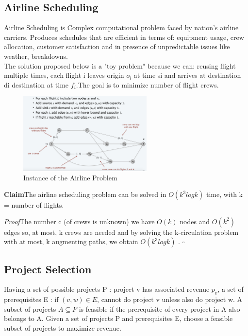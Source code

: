 \documentclass[11pt]{article}
\newenvironment{claim}[1]{\par\textbf{Claim}\space#1}{}
\newenvironment{proof}[1]{\par\textit{Proof}\space#1}{\hfill\ensuremath{\square}}
\begin{document}
\subsection{Airline Scheduling}

Airline Scheduling is Complex computational problem faced by nation's airline carriers. Produces schedules that are efficient in terms of: equipment usage, crew allocation, customer satisfaction
and in presence of unpredictable issues like weather, breakdowns.\\
The solution proposed below is a "toy problem" because we can: reusing flight multiple times, each
flight i leaves origin $o_{i}$ at time si and arrives at destination di destination at time $f_{i}$.The goal is to minimize number of flight crews.

\begin{figure}[H]
		\centering
		\includegraphics[width=0.6\textwidth ]{airline}
		\caption{Instance of the Airline Problem}
\end{figure}

\begin{claim}
The airline scheduling problem can be solved in $O(k^{3} log k)$ time, with k = number of flights.
\end{claim}

\begin{proof}
The number c (of crews is unknown) we have $O(k)$ nodes and $O(k^{2})$ edges so, at most, k crews are needed and by solving the k-circulation problem with at most, k augmenting paths, we obtain $O(k^{3} log k)$ .
\end{proof}

\subsection{Project Selection}
Having a set of possible projects P : project v has associated revenue $p_{v}$, a set of prerequisites E : if $(v, w) \in E$, cannot do project v unless also do project w. A subset of projects $A \subseteq P$ is feasible if the prerequisite of every project in A also belongs to A. Given a set of projects P and prerequisites E, choose a feasible subset of projects to maximize revenue.
\end{document}
